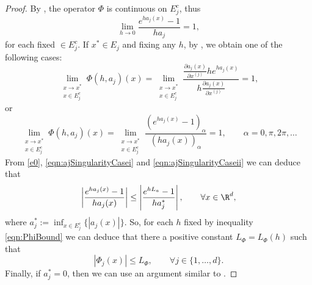 \begin{proof}    By , the operator $\Phi$ is continuous
	on $E_j^c$, thus 
	\begin{equation}\label{e0}
	\lim_{h\to 0}
	\frac{e^{ha_j(x)}-1}{ha_j}=1,
	\end{equation}
	for each fixed $\in E_j^c$. If $x^*\in E_j$ and fixing any $h$, by , 
	we obtain one of the following cases:
	\begin{equation}\label{eqn:ajSingularityCasei}
	\lim_{
		\substack{
			x \to x^*\\ 
			x\in E_j^c
		}
	}
	\Phi(h,a_j)(x) =
	\lim_{
		\substack{
			x \to x^*\\ 
			x\in E_j^c
		}
	}	
	\frac{\frac{\partial a_j(x)}{\partial x^{(j)}} 
		h e^{h a_j(x)} 
	}{
	h\frac{\partial a_j(x)}{\partial x^{(j)}}
}=1,
\end{equation}	
or
\begin{equation}\label{eqn:ajSingularityCaseii}
\lim_{
	\substack{
		x \to x^*\\ 
		x\in E_j^c
	}
}
\Phi(h,a_j)(x) 
=
%
\lim_{
	\substack{
		x \to x^*\\ 
		x\in E_j^c
	}
}	
\frac{
	\left(
	e^{h a_j(x)} - 1
	\right)_{\alpha}
}{
\left(
h a_j(x)
\right)_{\alpha}
}	=	1, \qquad \alpha = 0,\pi, 2\pi,\dots
\end{equation}	
From \eqref{e0}, \eqref{eqn:ajSingularityCasei} and \eqref{eqn:ajSingularityCaseii} we can deduce that 	
\begin{equation}\label{eqn:PhiBound}
	\left|\frac{e^{ha_j(x)}-1}{ha_j(x)}
	\right|\leq\left|\frac{e^{hL_a}-1}{ha^*_j}
	\right|,
	\qquad \forall x \in \R^d,
\end{equation}
where $a^*_j:= \inf_{x\in E_j^c}\{|a_j(x)|\}$. So, for each $h$ fixed by inequality \eqref{eqn:PhiBound} we can 
deduce that there a positive constant $L_{\Phi}=L_{\Phi}(h)$ such that
$$
	|\Phi_j(x)|\leq L_{\Phi}, \qquad \forall j\in \{1,\dots, d\}.	
$$ 
Finally, if $a^*_j=0$, then we can
use an argument similar to .	
\end{proof}

